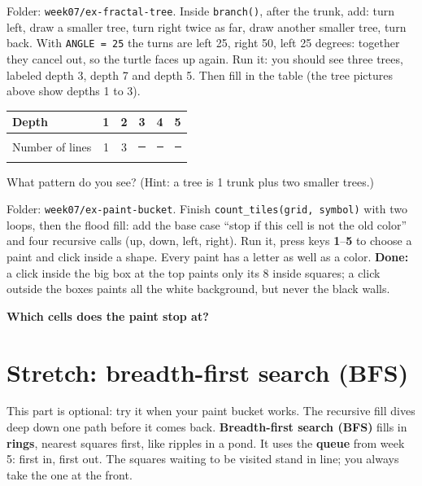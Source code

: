 \begin{exercise}
Folder: \texttt{week07/ex-fractal-tree}. Inside \texttt{branch()}, after the trunk, add: turn left, draw a smaller tree, turn right twice as far, draw another smaller tree, turn back. With \texttt{ANGLE = 25} the turns are left 25, right 50, left 25 degrees: together they cancel out, so the turtle faces up again. Run it: you should see three trees, labeled depth 3, depth 7 and depth 5. Then fill in the table (the tree pictures above show depths 1 to 3).

\begin{center}
\begin{tabular}{lccccc}
\toprule
Depth & 1 & 2 & 3 & 4 & 5\\ \midrule
Number of lines & 1 & 3 & \rule{0.8cm}{0.4pt} & \rule{0.8cm}{0.4pt} & \rule{0.8cm}{0.4pt}\\
\bottomrule
\end{tabular}
\end{center}
What pattern do you see? (Hint: a tree is 1 trunk plus two smaller trees.) 
\end{exercise}

\begin{exercise}
Folder: \texttt{week07/ex-paint-bucket}. Finish \texttt{count\_tiles(grid, symbol)} with two loops, then the flood fill: add the base case \enquote{stop if this cell is not the old color} and four recursive calls (up, down, left, right). Run it, press keys \textbf{1}--\textbf{5} to choose a paint and click inside a shape. Every paint has a letter as well as a color. \textbf{Done:} a click inside the big box at the top paints only its 8 inside squares; a click outside the boxes paints all the white background, but never the black walls.

\textbf{Which cells does the paint stop at?} 
\end{exercise}

\section{Stretch: breadth-first search (BFS)}
This part is optional: try it when your paint bucket works. The recursive fill dives deep down one path before it comes back. \textbf{Breadth-first search (BFS)} fills in \textbf{rings}, nearest squares first, like ripples in a pond. It uses the \textbf{queue} from week 5: first in, first out. The squares waiting to be visited stand in line; you always take the one at the front.


